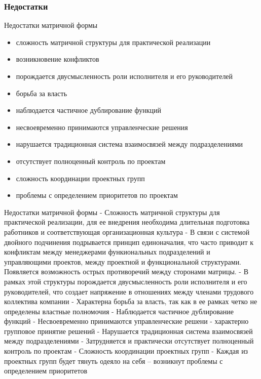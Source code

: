 \documentclass{../industrial-development}
\begin{document}
\begin{frame} \frametitle{Недостатки}
  \begin{block}{Недостатки матричной формы}
  \end{block}
  
  \begin{itemize}
  \item сложность матричной структуры для практической реализации
  \item возникновение конфликтов
  \item порождается двусмысленность роли исполнителя и его руководителей
  \item борьба за власть
  \item наблюдается частичное дублирование функций
  \item несвоевременно принимаются управленческие решения
  \item нарушается традиционная система взаимосвязей между подразделениями
  \item отсутствует полноценный контроль по проектам
  \item сложность координации проектных групп
  \item проблемы  с определением приоритетов по проектам
  \end{itemize}
\end{frame}

\lecturenotes
Недостатки матричной формы
- Сложность матричной структуры для практической реализации, для ее внедрения необходима длительная подготовка работников и соответствующая организационная культура
- В связи с системой двойного подчинения подрывается принцип единоначалия, что часто приводит к конфликтам между менеджерами функиональных подразделений и управляющими проектов, между проектной и функциональной структурами. Появляется возможность острых противоречий между сторонами матрицы.
- В рамках этой структуры порождается двусмысленность роли исполнителя и его руководителей, что создает напряжение в отношениях между членами трудового коллектива компании
- Характерна борьба за власть, так как в ее рамках четко не определены властные полномочия
- Наблюдается частичное дублирование функций
- Несвоевременно принимаются управленческие решени - характерно групповое принятие решений
- Нарушается традиционная система взаимосвязей между подразделениями
- Затрудняется и практически отсутствует полноценный контроль по проектам
- Сложность координации проектных групп
- Каждая из проектных групп будет тянуть одеяло на себя – возникнут проблемы  с определением приоритетов
\end{document}
